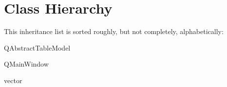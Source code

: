 \section{Class Hierarchy}
This inheritance list is sorted roughly, but not completely, alphabetically\+:\begin{DoxyCompactList}
\item {}
\item Q\+Abstract\+Table\+Model\begin{DoxyCompactList}
\item {}
\end{DoxyCompactList}
\item Q\+Main\+Window\begin{DoxyCompactList}
\item {}
\end{DoxyCompactList}
\item vector\begin{DoxyCompactList}
\item {}
\end{DoxyCompactList}
\end{DoxyCompactList}
